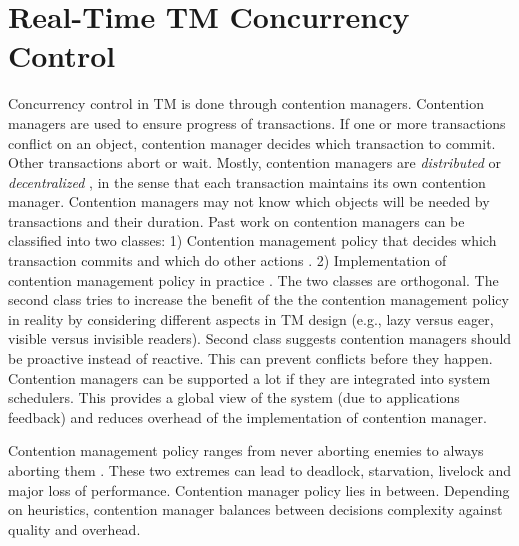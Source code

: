 \section{\label{sec:contention manager}Real-Time TM Concurrency Control}
Concurrency control in TM is done through contention managers. Contention managers are used to ensure progress of transactions. If one or more transactions conflict on an object, contention manager
decides which transaction to commit. Other transactions abort or wait.
Mostly, contention managers are \textit{distributed} or \textit{decentralized}
\cite{Scherer:2005:ACM:1073814.1073861,scherer2004contention,Guerraoui:2005:TTT:1073814.1073863,Guerraoui:2006:TTT:1146381.1146429},
in the sense that each transaction maintains its own contention manager.
Contention managers may not know which objects will be needed by transactions
and their duration. Past work on contention managers can be classified
into two classes: 1) Contention management policy that decides which
transaction commits and which do other actions \cite{Guerraoui:2005:TTT:1073814.1073863,Guerraoui:2006:TTT:1146381.1146429,Scherer:2005:ACM:1073814.1073861,scherer2004contention,Spear:2009:CSC:1504176.1504199,springerlink:10.1007_11561927_23}.
2) Implementation of contention management policy in practice \cite{Spear:2009:CSC:1504176.1504199,Maldonado:2010:SST:1693453.1693465,Blake:2009:PTS:1669112.1669133,gottschlich2008extending,Scherer:2005:ACM:1073814.1073861,Dolev:2008:CSC:1400751.1400769}.
The two classes are orthogonal. The second class tries to increase
the benefit of the the contention management policy in reality by
considering different aspects in TM design (e.g., lazy versus eager,
visible versus invisible readers). Second class suggests contention
managers should be proactive instead of reactive. This can prevent
conflicts before they happen. Contention managers can be supported
a lot if they are integrated into system schedulers. This provides
a global view of the system (due to applications feedback) and reduces
overhead of the implementation of contention manager.

Contention management policy ranges from never aborting enemies to
always aborting them \cite{Scherer:2005:ACM:1073814.1073861,scherer2004contention}.
These two extremes can lead to deadlock, starvation, livelock and
major loss of performance. Contention manager policy lies in between.
Depending on heuristics, contention manager balances between decisions
complexity against quality and overhead.

